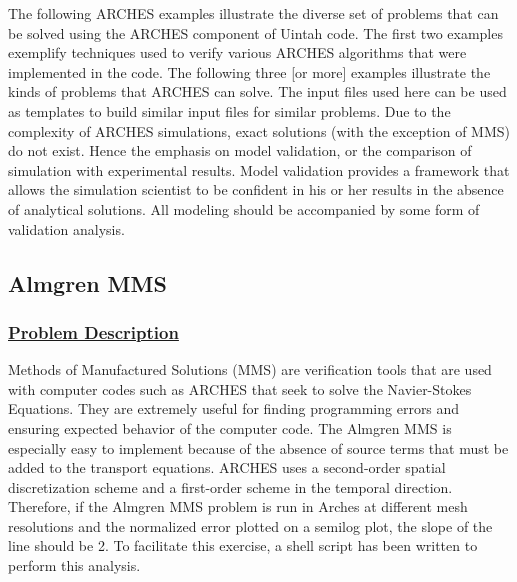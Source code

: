 The following ARCHES examples illustrate the diverse set of problems that can be solved using the ARCHES component of Uintah code.  The first two examples exemplify techniques used to verify various ARCHES algorithms that were implemented in the code.  The following three [or more] examples illustrate the kinds of problems that ARCHES can solve.  The input files used here can be used as templates to build similar input files for similar problems. 
Due to the complexity of ARCHES simulations, exact solutions (with the exception of MMS) do not exist.  Hence the emphasis on model validation, or the comparison of simulation with experimental results.  Model validation provides a framework that allows the simulation scientist to be confident in his or her results in the absence of analytical solutions.  All modeling should be accompanied by some form of validation analysis.


\subsection*{\center Almgren MMS}
\subsubsection*{\underline{Problem Description}}

Methods of Manufactured Solutions (MMS) are verification tools that are used with computer codes such as ARCHES that seek to solve the Navier-Stokes Equations.  They are extremely useful for finding programming errors and ensuring expected behavior of the computer code.   The Almgren MMS is especially easy to implement because of the absence of source terms that must be added to the transport equations.
ARCHES uses a second-order spatial discretization scheme and a first-order scheme in the temporal direction.  Therefore, if the Almgren MMS problem is run in Arches at different mesh resolutions and the normalized error plotted on a semilog plot, the slope of the line should be 2.  To facilitate this exercise, a shell script has been written to perform this analysis.

